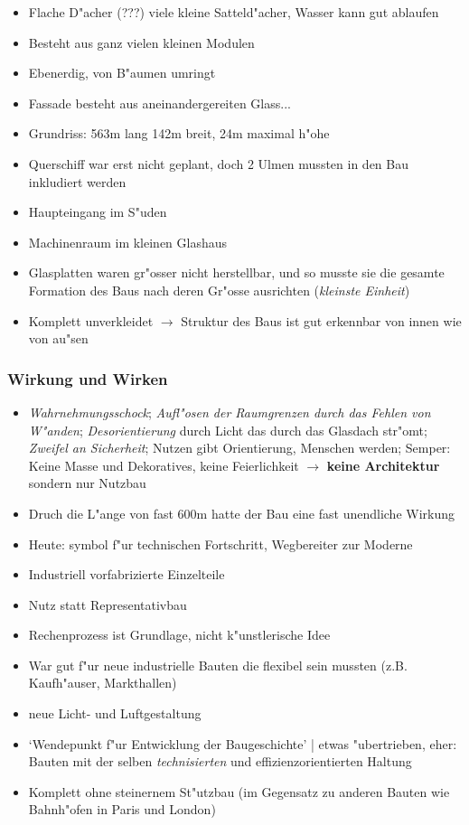 \documentclass[a5paper]{scrartcl}
\begin{document}
\begin{itemize}
  \item Flache D"acher (???) viele kleine Satteld"acher, Wasser kann gut ablaufen
  \item Besteht aus ganz vielen kleinen Modulen
  \item Ebenerdig, von B"aumen umringt
  \item Fassade besteht aus aneinandergereiten Glass...
  \item Grundriss: 563m lang 142m breit, 24m maximal h"ohe
  \item Querschiff war erst nicht geplant, doch 2 Ulmen mussten in den Bau inkludiert werden
  \item Haupteingang im S"uden
  \item Machinenraum im kleinen Glashaus
  \item Glasplatten waren gr"osser nicht herstellbar, und so musste sie die gesamte Formation des Baus nach deren Gr"osse ausrichten (\emph{kleinste Einheit})
  \item Komplett unverkleidet $\rightarrow$ Struktur des Baus ist gut erkennbar von innen wie von au"sen
\end{itemize}

\subsubsection{Wirkung und Wirken}
\begin{itemize}
  \item \emph{Wahrnehmungsschock}; \emph{Aufl"osen der Raumgrenzen durch das Fehlen von W"anden}; \emph{Desorientierung} durch Licht das durch das Glasdach str"omt; \emph{Zweifel an Sicherheit}; Nutzen gibt Orientierung, Menschen werden; Semper: Keine Masse und Dekoratives, keine Feierlichkeit $\rightarrow$ \textbf{keine Architektur} sondern nur Nutzbau
  \item Druch die L"ange von fast 600m hatte der Bau eine fast unendliche Wirkung 
  \item Heute: symbol f"ur technischen Fortschritt, Wegbereiter zur Moderne
  \item Industriell vorfabrizierte Einzelteile
  \item Nutz statt Representativbau
  \item Rechenprozess ist Grundlage, nicht k"unstlerische Idee
  \item War gut f"ur neue industrielle Bauten die flexibel sein mussten (z.B. Kaufh"auser, Markthallen)
  \item neue Licht- und Luftgestaltung
  \item `Wendepunkt f"ur Entwicklung der Baugeschichte' | etwas "ubertrieben, eher: Bauten mit der selben \emph{technisierten} und effizienzorientierten Haltung
  \item Komplett ohne steinernem St"utzbau (im Gegensatz zu anderen Bauten wie Bahnh"ofen in Paris und London)
\end{itemize}
\end{document}
